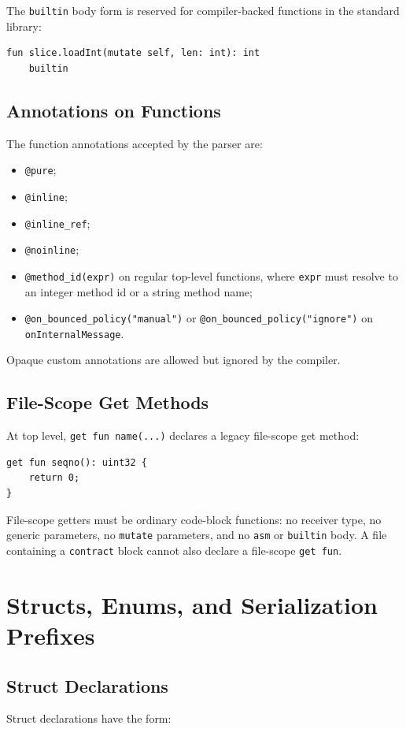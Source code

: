 \documentclass[12pt,oneside]{article}
\begin{document}
The \verb|builtin| body form is reserved for compiler-backed functions in the
standard library:

\begin{verbatim}
fun slice.loadInt(mutate self, len: int): int
    builtin
\end{verbatim}

\subsection{Annotations on Functions}
The function annotations accepted by the parser are:

\begin{itemize}
\item \verb|@pure|;
\item \verb|@inline|;
\item \verb|@inline_ref|;
\item \verb|@noinline|;
\item \verb|@method_id(expr)| on regular top-level functions, where
\verb|expr| must resolve to an integer method id or a string method name;
\item \verb|@on_bounced_policy("manual")| or
\verb|@on_bounced_policy("ignore")| on \verb|onInternalMessage|.
\end{itemize}

Opaque custom annotations are allowed but ignored by the compiler.

\subsection{File-Scope Get Methods}
At top level, \verb|get fun name(...)| declares a legacy file-scope get method:

\begin{verbatim}
get fun seqno(): uint32 {
    return 0;
}
\end{verbatim}

File-scope getters must be ordinary code-block functions: no receiver type, no
generic parameters, no \verb|mutate| parameters, and no \verb|asm| or
\verb|builtin| body. A file containing a \verb|contract| block cannot also
declare a file-scope \verb|get fun|.

\section{Structs, Enums, and Serialization Prefixes}
\label{sec:structs}
\subsection{Struct Declarations}
Struct declarations have the form:
\end{document}
